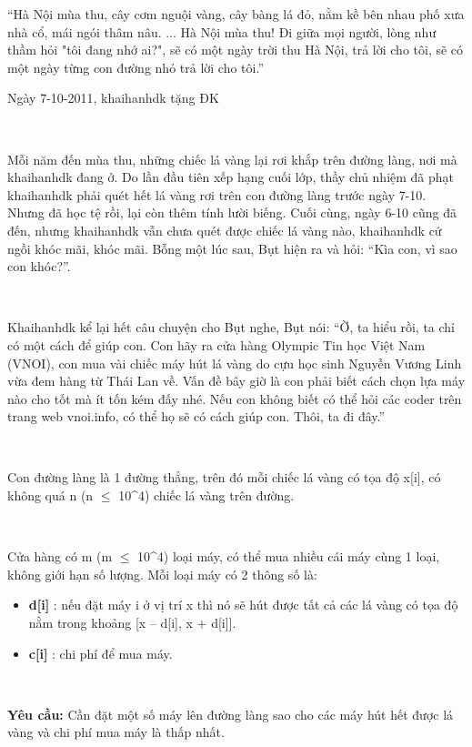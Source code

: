 “Hà Nội mùa thu, cây cơm nguội vàng, cây bàng lá đỏ, nằm kề bên nhau phố xưa nhà cổ, mái ngói thâm nâu. ... Hà Nội mùa thu! Đi giữa mọi người, lòng như thầm hỏi "tôi đang nhớ ai?", sẽ có một ngày trời thu Hà Nội, trả lời cho tôi, sẽ có một ngày từng con đường nhỏ trả lời cho tôi.”

Ngày 7-10-2011, khaihanhdk tặng ĐK

 

Mỗi năm đến mùa thu, những chiếc lá vàng lại rơi khắp trên đường làng, nơi mà khaihanhdk đang ở. Do lần đầu tiên xếp hạng cuối lớp, thầy chủ nhiệm đã phạt khaihanhdk phải quét hết lá vàng rơi trên con đường làng trước ngày 7-10. Nhưng đã học tệ rồi, lại còn thêm tính lười biếng. Cuối cùng, ngày 6-10 cũng đã đến, nhưng khaihanhdk vẫn chưa quét được chiếc lá vàng nào, khaihanhdk cứ ngồi khóc mãi, khóc mãi. Bỗng một lúc sau, Bụt hiện ra và hỏi: “Kìa con, vì sao con khóc?”.

 

Khaihanhdk kể lại hết câu chuyện cho Bụt nghe, Bụt nói: “Ờ, ta hiểu rồi, ta chỉ có một cách để giúp con. Con hãy ra cửa hàng Olympic Tin học Việt Nam (VNOI), con mua vài chiếc máy hút lá vàng do cựu học sinh Nguyễn Vương Linh vừa đem hàng từ Thái Lan về. Vấn đề bây giờ là con phải biết cách chọn lựa máy nào cho tốt mà ít tốn kém đấy nhé. Nếu con không biết có thể hỏi các coder trên trang web vnoi.info, có thể họ sẽ có cách giúp con. Thôi, ta đi đây.”

 

Con đường làng là 1 đường thẳng, trên đó mỗi chiếc lá vàng có tọa độ x[i], có không quá n (n  $\le$  10^4) chiếc lá vàng trên đường.

 

Cửa hàng có m (m  $\le$  10^4) loại máy, có thể mua nhiều cái máy cùng 1 loại, không giới hạn số lượng. Mỗi loại máy có 2 thông số là:
\begin{itemize}
	\item \textbf{d[i] } : nếu đặt máy i ở vị trí x thì nó sẽ hút được tất cả các lá vàng có tọa độ nằm trong khoảng [x – d[i], x + d[i]].
	\item \textbf{c[i] } : chi phí để mua máy.
\end{itemize}

 

\textbf{Yêu cầu: } Cần đặt một số máy lên đường làng sao cho các máy hút hết được lá vàng và chi phí mua máy là thấp nhất.

\